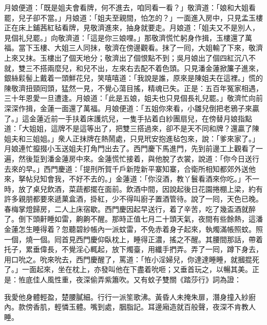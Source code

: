 月娘便道：「既是姐夫會看牌，何不進去，咱同看一看？」{}敬濟道：「娘和大姐看罷，兒子卻不當。」{}月娘道：「姐夫至親間，怕怎的？」一面進入房中，只見孟玉樓正在床上鋪茜紅毡看牌，見敬濟進來，抽身就要走。月娘道：「姐夫又不是別人，見個礼兒罷。」{}向敬濟道：「這是你三娘哩。」那敬濟慌忙躬身作揖，玉樓還了萬福。當下玉樓、大姐三人同抹，敬濟在傍邊觀看。抹了一囘，大姐輸了下來，敬濟上來又抹。玉樓出了個天地分；敬濟出了個恨點不到；吳月娘出了個四紅沉八不就，雙三不搭兩麼兒，和兒不出，左來右去配不着色頭。只見潘金蓮掀簾子進來，銀絲鬏髻上戴着一頭鮮花兒，{}笑嘻嘻道：「我說是誰，原來是陳姐夫在這裡。」{}慌的陳敬濟扭頸囘頭，猛然一見，不覺心蕩目搖，精魂已失。正是：五百年冤家相遇，三十年恩愛一旦遭逢。月娘道：「此是五娘，姐夫也只見個長礼兒罷。」敬濟忙向前深深作揖，金蓮一面還了萬福。月娘便道：「五姐你來看，小雛兒倒把老鴉子來贏了。」這金蓮近前一手扶着床護炕兒，一隻手拈着白紗團扇兒，在傍替月娘指點道：「大姐姐，這牌不是這等出了，把雙三搭過來，卻不是天不同和牌？還贏了陳姐夫和三姐姐。」衆人正抹牌在熱鬧處，只見玳安抱進毡包來，說：「爹來家了。」月娘連忙攛掇小玉送姐夫打角門出去了。{}西門慶下馬進門，先到前邊工上觀看了一遍，然後踅到潘金蓮房中來。金蓮慌忙接着，與他脫了衣裳，說道：「你今日送行去來的早。」西門慶道：「提刑所賀千戶新陞新平寨知寨，合衛所相知都郊外送他來，拏帖兒知會我，不好不去的。」金蓮道：「你沒酒，教丫鬟看酒來你吃。」不一時，放了桌兒飲酒，菜蔬都擺在面前。飲酒中間，因說起後日花園捲棚上梁，約有許多親朋都要來遞菓盒酒，掛紅，少不得叫廚子置酒管待。說了一囘，天色已晚。春梅掌燈歸房，二人上床宿歇。西門慶因起早送行，着了辛苦，吃了幾盃酒就醉了。倒下頭鼾睡如雷，齁齁不醒。那時正值七月二十頭天氣，夜間有些餘熱，這潘金蓮怎生睡得着？忽聽碧紗帳內一派蚊雷，不免赤着身子起來，執燭滿帳照蚊。照一個，燒一個。囘首見西門慶仰臥枕上，睡得正濃，搖之不醒。其腰間那話，帶着托子，累垂偉長，不覺淫心輒起，放下燭臺，用纖手捫弄。{}弄了一囘，蹲下身去，用口吮之。吮來吮去，西門慶醒了，罵道：「恠小淫婦兒，你達達睡睡，就摑掍死了。」一面起來，坐在枕上，亦發叫他在下盡着吮咂；又垂首玩之，以暢其美。正是：恠底佳人風性重，夜深偷弄紫簫吹。又有蚊子雙關《踏莎行》詞為證：

我愛他身體輕盈，楚腰膩細。行行一派笙歌沸。黃昏人未掩朱扉，潛身撞入紗廚內。款傍香肌，輕憐玉體。嘴到處，胭脂記。耳邊廂造就百般聲，夜深不肯教人睡。

